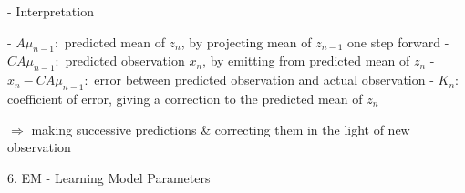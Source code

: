    - Interpretation

     - $A\mu_{n-1}:$ predicted mean of $z_n$, by projecting mean of $z_{n-1}$ one step forward
     - $CA\mu_{n-1}:$ predicted observation $x_n$, by emitting from predicted mean of $z_n$  
     - $x_n-CA\mu_{n-1}:$ error between predicted observation and actual observation
     - $K_n:$ coefficient of error, giving a correction to the predicted mean of $z_{n}$ 

     $\Rightarrow$ making successive predictions \& correcting them in the light of new observation

6. EM - Learning Model Parameters